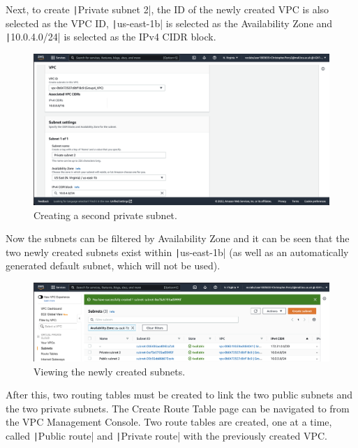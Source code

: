 Next, to create \texttt|Private subnet 2|, the ID of the newly created VPC is also selected as the VPC ID,
\texttt|us-east-1b| is selected as the Availability Zone and \texttt|10.0.4.0/24| is selected as the
IPv4 CIDR block.

\begin{figure}[!htbp]
    \centering
    \includegraphics[width=125mm]{resources/vpc/routes/vpc-private-subnet-2}
    \caption{Creating a second private subnet.}
    \label{fig:vpc-private-subnet-2}
\end{figure}

Now the subnets can be filtered by Availability Zone and it can be seen that the two newly created subnets exist within
\texttt|us-east-1b| (as well as an automatically generated default subnet, which will not be used).

\begin{figure}[!htbp]
    \centering
    \includegraphics[width=\textwidth]{resources/vpc/routes/vpc-subnets-2}
    \caption{Viewing the newly created subnets.}
    \label{fig:vpc-subnets-2}
\end{figure}

After this, two routing tables must be created to link the two public subnets and the two private subnets.
The Create Route Table page can be navigated to from the VPC Management Console.
Two route tables are created, one at a time, called \texttt|Public route| and \texttt|Private route|
with the previously created VPC\@.


